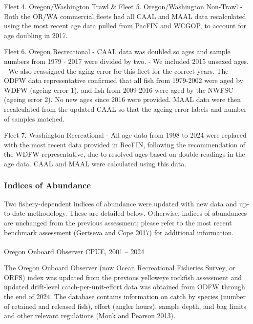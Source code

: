 \documentclass[
]{scrartcl}
\makeatletter
\let\oldparagraph\paragraph
\renewcommand{\paragraph}{
    \@ifstar
      \xxxParagraphStar
      \xxxParagraphNoStar
  }
\newcommand{\xxxParagraphStar}[1]{\oldparagraph*{#1}\mbox{}}
\newcommand{\xxxParagraphNoStar}[1]{\oldparagraph{#1}\mbox{}}
\makeatother
\begin{document}
Fleet 4. Oregon/Washington Trawl \& Fleet 5. Oregon/Washington Non-Trawl
- Both the OR/WA commercial fleets had all CAAL and MAAL data
recalculated using the most recent age data pulled from PacFIN and
WCGOP, to account for age doubling in 2017.

Fleet 6. Oregon Recreational - CAAL data was doubled so ages and sample
numbers from 1979 - 2017 were divided by two. - We included 2015 unsexed
ages. - We also reassigned the aging error for this fleet for the
correct years. The ODFW data representative confirmed that all fish from
1979-2002 were aged by WDFW (ageing error 1), and fish from 2009-2016
were aged by the NWFSC (ageing error 2). No new ages since 2016 were
provided. MAAL data were then recalculated from the updated CAAL so that
the ageing error labels and number of samples matched.

Fleet 7. Washington Recreational - All age data from 1998 to 2024 were
replaced with the most recent data provided in RecFIN, following the
recommendation of the WDFW representative, due to resolved ages based on
double readings in the age data. CAAL and MAAL were calculated using
this data.

\subsubsection{Indices of Abundance}\label{indices-of-abundance}

Two fishery-dependent indices of abundance were updated with new data
and up-to-date methodology. These are detailed below. Otherwise, indices
of abundances are unchanged from the previous assessment; please refer
to the most recent benchmark assessment (Gertseva and Cope 2017) for
additional information.

\paragraph{Oregon Onboard Observer CPUE, 2001 --
2024}\label{oregon-onboard-observer-cpue-2001-2024}

The Oregon Onboard Observer (now Ocean Recreational Fisheries Survey, or
ORFS) index was updated from the previous yelloweye rockfish assessment
and updated drift-level catch-per-unit-effort data was obtained from
ODFW through the end of 2024. The database contains information on catch
by species (number of retained and released fish), effort (angler
hours), sample depth, and bag limits and other relevant regulations
(Monk and Pearson 2013).
\end{document}
